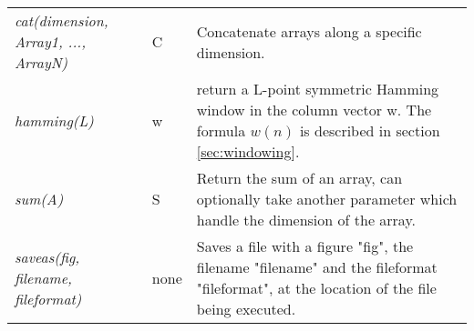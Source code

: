 \begin{longtabu}{>{\em}X l X}
cat(dimension, Array1, ..., ArrayN) & C & Concatenate arrays along a specific dimension.  \\
hamming(L) & w & return a L-point symmetric Hamming window in the column vector w. The formula $w(n)$ is described in section \ref{sec:windowing}. \\
sum(A) & S & Return the sum of an array, can optionally take another parameter which handle the dimension of the array. \\
saveas(fig, filename, fileformat) & none & Saves a file with a figure "fig", the filename "filename" and the fileformat "fileformat", at the location of the file being executed. \\
\end{longtabu}
